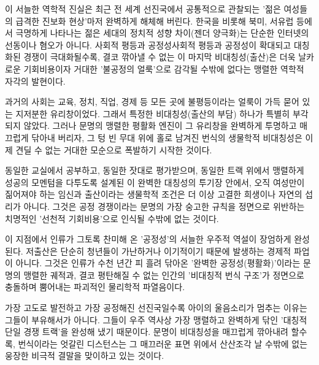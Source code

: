 이 서늘한 역학적 진실은 최근 전 세계 선진국에서 공통적으로 관찰되는 '젊은 여성들의 급격한 진보화 현상'마저 완벽하게 해체해 버린다. 한국을 비롯해 북미, 서유럽 등에서 극명하게 나타나는 젊은 세대의 정치적 성향 차이(젠더 양극화)는 단순한 인터넷의 선동이나 혐오가 아니다. 사회적 평등과 공정성사회적 평등과 공정성이 확대되고 대칭화된 경쟁이 극대화될수록, 결코 깎아낼 수 없는 이 마지막 비대칭성(출산)은 더욱 날카로운 기회비용이자 거대한 '불공정의 얼룩'으로 감각될 수밖에 없다는 맹렬한 역학적 자각의 발현이다.

과거의 사회는 교육, 정치, 직업, 경제 등 모든 곳에 불평등이라는 얼룩이 가득 묻어 있는 지저분한 유리창이었다. 그래서 특정한 비대칭성(출산의 부담) 하나가 특별히 부각되지 않았다. 그러나 문명의 맹렬한 평활화 엔진이 그 유리창을 완벽하게 투명하고 매끄럽게 닦아내 버리자, 그 텅 빈 무대 위에 홀로 남겨진 번식의 생물학적 비대칭성은 이제 견딜 수 없는 거대한 모순으로 폭발하기 시작한 것이다.

동일한 교실에서 공부하고, 동일한 잣대로 평가받으며, 동일한 트랙 위에서 맹렬하게 성공의 모멘텀을 다투도록 설계된 이 완벽한 대칭성의 투기장 안에서, 오직 여성만이 짊어져야 하는 임신과 출산이라는 생물학적 조건은 더 이상 고결한 희생이나 자연의 섭리가 아니다. 그것은 공정 경쟁이라는 문명의 가장 숭고한 규칙을 정면으로 위반하는 치명적인 '선천적 기회비용'으로 인식될 수밖에 없는 것이다.

이 지점에서 인류가 그토록 찬미해 온 '공정성'의 서늘한 우주적 역설이 장엄하게 완성된다. 저출산은 단순히 청년들이 가난하거나 이기적이기 때문에 발생하는 경제적 파업이 아니다. 그것은 인류가 수천 년간 피 흘려 닦아온 '완벽한 공정성(평활화)'이라는 문명의 맹렬한 궤적과, 결코 평탄해질 수 없는 인간의 '비대칭적 번식 구조'가 정면으로 충돌하며 뿜어내는 파괴적인 물리학적 파열음이다.

가장 고도로 발전하고 가장 공정해진 선진국일수록 아이의 울음소리가 멈추는 이유는 그들이 부유해서가 아니다. 그들이 우주 역사상 가장 맹렬하고 완벽하게 닦인 '대칭적 단일 경쟁 트랙'을 완성해 냈기 때문이다. 문명이 비대칭성을 매끄럽게 깎아내려 할수록, 번식이라는 엇갈린 디스턴스는 그 매끄러운 표면 위에서 산산조각 날 수밖에 없는 웅장한 비극적 결말을 맞이하고 있는 것이다.
